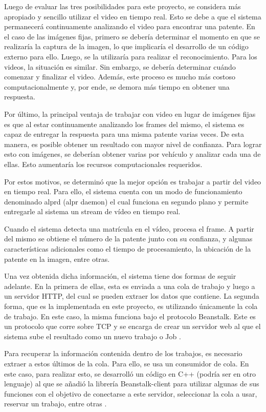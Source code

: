Luego de evaluar las tres posibilidades para este proyecto, se considera más apropiado y sencillo utilizar el video en tiempo real. Esto se debe a que el sistema permanecerá continuamente analizando el video para encontrar una patente. En el caso de las imágenes fijas, primero se debería determinar el momento en que se realizaría la captura de la imagen, lo que implicaría el desarrollo de un código externo para ello. Luego, se la utilizaría para realizar el reconocimiento. Para los videos, la situación es similar. Sin embargo, se debería determinar cuándo comenzar y finalizar el video.  Además, este proceso es mucho más costoso computacionalmente y, por ende, se demora más tiempo en obtener una respuesta.

Por último, la principal ventaja de trabajar con video en lugar de imágenes fijas es que al estar continuamente analizando los frames del mismo, el sistema es capaz de entregar la respuesta para una misma patente varias veces. De esta manera, es posible obtener un resultado con mayor nivel de confianza. Para lograr esto con imágenes, se deberían obtener varias por vehículo y analizar cada una de ellas. Esto aumentaría los recursos computacionales requeridos. 

Por estos motivos, se determinó que la mejor opción es trabajar a partir del video en tiempo real. Para ello, el sistema cuenta con un modo de funcionamiento denominado alprd (alpr daemon) el cual funciona en segundo plano y permite entregarle al sistema un stream de vídeo en tiempo real.

Cuando el sistema detecta una matrícula en el vídeo, procesa el frame. A partir del mismo se obtiene el número de la patente junto con su confianza, y algunas características adicionales como el tiempo de procesamiento, la ubicación de la patente en la imagen, entre otras.

Una vez obtenida dicha información, el sistema tiene dos formas de seguir adelante. En la primera de ellas, esta es enviada a una cola de trabajo y luego a un servidor HTTP, del cual se pueden extraer los datos que contiene. La segunda forma, que es la implementada en este proyecto, es utilizando únicamente la cola de trabajo. En este caso, la misma funciona bajo el protocolo Beanstalk. Este es un protocolo que corre sobre TCP y se encarga de crear un servidor web al que el sistema sube el resultado como un nuevo trabajo o Job \cite{beanstalkprotocol}.

Para recuperar la información contenida dentro de los trabajos, es necesario extraer a estos últimos de la cola. Para ello, se usa un consumidor de cola. En este caso, para realizar esto, se desarrolló un código en C++ (podría ser en otro lenguaje) al que se añadió la librería Beanstalk-client para utilizar algunas de sus funciones con el objetivo de conectarse a este servidor, seleccionar la cola a usar, reservar un trabajo, entre otras \cite{beanstalkclient}.

